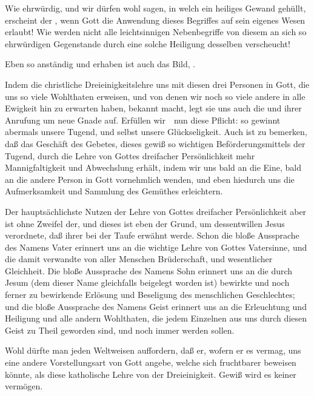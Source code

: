 \begin{aufza}
\item Wie ehrwürdig, und wir dürfen wohl sagen, in welch ein heiliges Gewand gehüllt, erscheint der , wenn Gott die Anwendung dieses Begriffes auf sein eigenes Wesen erlaubt! Wie werden nicht alle leichtsinnigen Nebenbegriffe von diesem an sich so ehrwürdigen Gegenstande durch eine solche Heiligung desselben verscheucht!
\item Eben so anständig und erhaben ist auch das Bild, .
\item Indem die christliche Dreieinigkeitslehre uns mit diesen drei Personen in Gott, die uns so viele Wohlthaten erweisen, und von denen wir noch so viele andere in alle Ewigkeit hin zu erwarten haben, bekannt macht, legt sie uns auch die  und ihrer Anrufung um neue Gnade auf. Erfüllen wir~\ nun diese Pflicht: so gewinnt abermals unsere Tugend, und selbst unsere Glückseligkeit. Auch ist zu bemerken, daß das Geschäft des Gebetes, dieses gewiß so wichtigen Beförderungsmittels der Tugend, durch die Lehre von Gottes dreifacher Persönlichkeit mehr Mannigfaltigkeit und Abwechslung erhält, indem wir uns bald an die Eine, bald an die andere Person in Gott vornehmlich wenden, und eben hiedurch uns die Aufmerksamkeit und Sammlung des Gemüthes erleichtern.
\item Der hauptsächlichste Nutzen der Lehre von Gottes dreifacher Persönlichkeit aber ist ohne Zweifel der,  und dieses ist eben der Grund, um dessentwillen Jesus verordnete, daß ihrer bei der Taufe erwähnt werde. Schon die bloße Aussprache des Namens Vater erinnert uns an die wichtige Lehre von Gottes Vatersinne, und die damit verwandte von aller Menschen Brüderschaft, und wesentlicher Gleichheit. Die bloße Aussprache des Namens Sohn erinnert uns an die durch Jesum (dem dieser Name gleichfalls beigelegt worden ist) bewirkte und noch ferner zu bewirkende Erlösung und Beseligung des menschlichen Geschlechtes; und die bloße Aussprache des Namens Geist erinnert uns an die Erleuchtung und Heiligung und alle andern Wohlthaten, die jedem Einzelnen aus uns durch diesen Geist zu Theil geworden sind, und noch immer werden sollen.
\end{aufza}

\begin{RWanm} 
Wohl dürfte man jeden Weltweisen auffordern, daß er, wofern er es vermag, uns eine andere Vorstellungsart von Gott angebe, welche sich fruchtbarer beweisen könnte, als diese katholische Lehre von der Dreieinigkeit. Gewiß wird es keiner vermögen. 
\end{RWanm}

